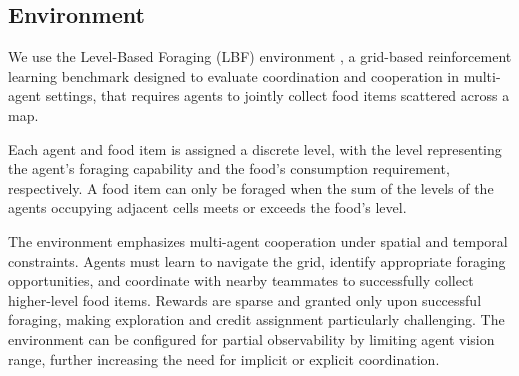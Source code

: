 \documentclass{article}
\begin{document}

    
\subsection{Environment}

We use the Level-Based Foraging (LBF) environment \cite{papoudakis2021},
a grid-based reinforcement learning benchmark designed to evaluate 
coordination and cooperation in multi-agent settings,
that requires agents to jointly collect food items scattered across a map. 

Each agent and food item is assigned a discrete level, with the level representing 
the agent's foraging capability and the food's consumption requirement, respectively.
A food item can only be foraged when the sum of the levels of the agents 
occupying adjacent cells meets or exceeds the food's level.

The environment emphasizes multi-agent cooperation under spatial and temporal constraints. 
Agents must learn to navigate the grid, identify appropriate foraging opportunities, 
and coordinate with nearby teammates to successfully collect higher-level food items. 
Rewards are sparse and granted only upon successful foraging, 
making exploration and credit assignment particularly challenging. 
The environment can be configured for partial observability by limiting agent vision range, 
further increasing the need for implicit or explicit coordination.


\end{document}
